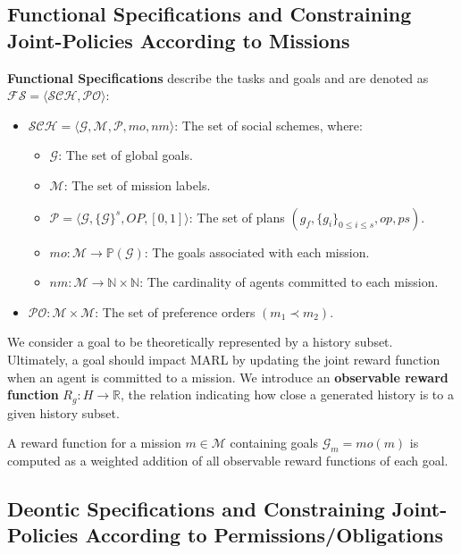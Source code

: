 \documentclass[conference]{IEEEtran}
\newcounter{relation}
\begin{document}
\subsection{Functional Specifications and Constraining Joint-Policies According to Missions}

\textbf{Functional Specifications} describe the tasks and goals and are denoted as $\mathcal{FS} = \langle \mathcal{SCH}, \mathcal{PO} \rangle$:

\begin{itemize}
    \item $\mathcal{SCH} = \langle \mathcal{G}, \mathcal{M}, \mathcal{P}, mo, nm \rangle$: The set of social schemes, where:
          \begin{itemize}
              \item $\mathcal{G}$: The set of global goals.
              \item $\mathcal{M}$: The set of mission labels.
              \item $\mathcal{P} = \langle \mathcal{G}, \{\mathcal{G}\}^s, OP, [0,1] \rangle$: The set of plans $(g_f, \{g_i\}_{0 \leq i \leq s}, op, ps)$.
              \item $mo: \mathcal{M} \rightarrow \mathbb{P}(\mathcal{G})$: The goals associated with each mission.
              \item $nm: \mathcal{M} \rightarrow \mathbb{N} \times \mathbb{N}$: The cardinality of agents committed to each mission.
          \end{itemize}
    \item $\mathcal{PO}: \mathcal{M} \times \mathcal{M}$: The set of preference orders $(m_1 \prec m_2)$.
\end{itemize}

We consider a goal to be theoretically represented by a history subset. Ultimately, a goal should impact MARL by updating the joint reward function when an agent is committed to a mission. We introduce an \textbf{observable reward function} $R_{g}: H \rightarrow \mathbb{R}$, the relation indicating how close a generated history is to a given history subset.

A reward function for a mission $m \in \mathcal{M}$ containing goals $\mathcal{G}_{m} = mo(m)$ is computed as a weighted addition of all observable reward functions of each goal.

\subsection{Deontic Specifications and Constraining Joint-Policies According to Permissions/Obligations}
\end{document}
